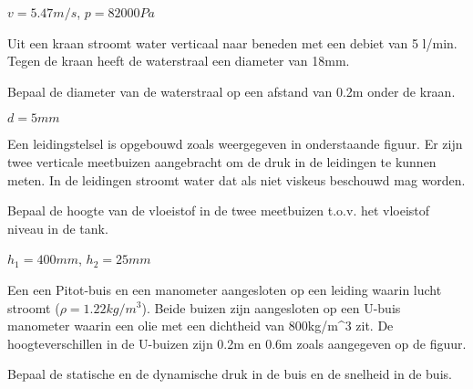 	\begin{antwoord}
		$v = \unit{5.47}{m/s}$, $p = \unit{82000}{Pa}$
	\end{antwoord}
	\begin{toepassing}
		\label{waterkraan}
Uit een kraan stroomt water verticaal naar beneden met een debiet van 5 l/min. Tegen de kraan heeft de waterstraal een diameter van 18mm. 

Bepaal de diameter van de waterstraal op een afstand van 0.2m onder de kraan.
		\begin{center}
			
		\end{center}
	\end{toepassing}
	\begin{antwoord}
		$d = \unit{5}{mm}$
	\end{antwoord}
	\begin{toepassing}
		\label{drukhoogte}
Een leidingstelsel is opgebouwd zoals weergegeven in onderstaande figuur. Er zijn twee verticale meetbuizen aangebracht om de druk in de leidingen te kunnen meten. In de leidingen stroomt water dat als niet viskeus beschouwd mag worden.
		
Bepaal de hoogte van de vloeistof in de twee meetbuizen t.o.v. het vloeistof niveau in de tank.
		\begin{center}
			
		\end{center}
	\end{toepassing}
	\begin{antwoord}
		$h_1 = \unit{400}{mm}$, $h_2 = \unit{25}{mm}$
	\end{antwoord}
	\begin{toepassing}
		\label{dynamische_druk}
Een een Pitot-buis en een manometer aangesloten op een leiding waarin lucht stroomt ($\rho=\unit{1.22}{kg/m^3}$). Beide buizen zijn aangesloten op een U-buis manometer waarin een olie met een dichtheid van \unit{800}{kg/m^3} zit. De hoogteverschillen in de U-buizen zijn 0.2m en 0.6m zoals aangegeven op de figuur.

Bepaal de statische en de dynamische druk in de buis en de snelheid in de buis.
		\begin{center}
			
		\end{center}
	\end{toepassing}
